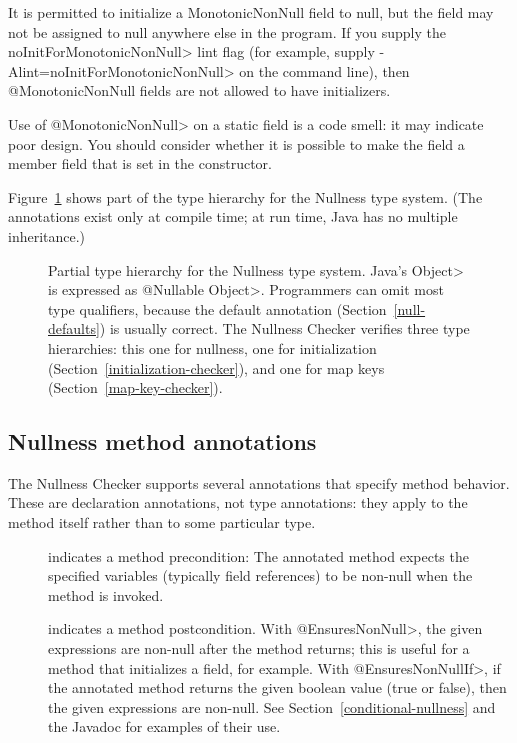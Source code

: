 \begin{description}
  It is permitted to initialize a MonotonicNonNull field to null, but the
  field may not be assigned to null anywhere else in the program.  If you
  supply the \<noInitForMonotonicNonNull> lint flag (for example, supply 
  \<-Alint=noInitForMonotonicNonNull> on the command line), then
  @MonotonicNonNull fields are not allowed to have initializers.

  Use of \<@MonotonicNonNull> on a static field is a code smell:  it may
  indicate poor design.  You should consider whether it is possible to make
  the field a member field that is set in the constructor.

\end{description}

Figure~\ref{fig-nullness-hierarchy} shows part of the type hierarchy for the
Nullness type system.
(The annotations exist only at compile time; at run time, Java has no
multiple inheritance.)

\begin{figure}
\caption{Partial type hierarchy for the Nullness type system.
Java's \<Object> is expressed as \<@Nullable Object>.  Programmers can omit
most type qualifiers, because the default annotation
(Section~\ref{null-defaults}) is usually correct.
The Nullness Checker verifies three type hierarchies:  this one for
nullness, one for initialization (Section~\ref{initialization-checker}),
and one for map keys (Section~\ref{map-key-checker}).}
\label{fig-nullness-hierarchy}
\end{figure}


\subsection{Nullness method annotations\label{nullness-method-annotations}}

The Nullness Checker supports several annotations that specify method
behavior.  These are declaration annotations, not type annotations:  they
apply to the method itself rather than to some particular type.

\begin{description}

\item[]
  indicates a method precondition:  The annotated method expects the
  specified variables (typically field references) to be non-null when the
  method is invoked.

\item[]
\item[]
  indicates a method postcondition.  With \<@EnsuresNonNull>, the given
  expressions are non-null after the method returns; this is useful for a
  method that initializes a field, for example.  With
  \<@EnsuresNonNullIf>, if the annotated
  method returns the given boolean value (true or false), then the given
  expressions are non-null.  See Section~\ref{conditional-nullness} and the
  Javadoc for examples of their use.

\end{description}


